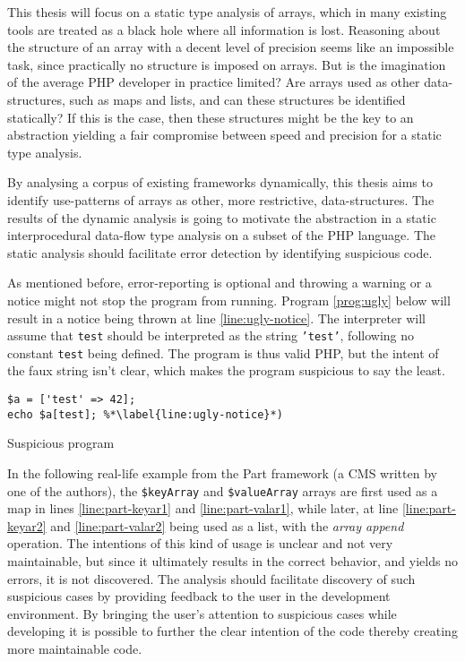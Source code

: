 This thesis will focus on a static type analysis of arrays, which in many existing tools are treated as a black hole where all information is lost.  Reasoning about the structure of an array with a decent level of precision seems like an impossible task, since practically no structure is imposed on arrays. But is the imagination of the average PHP developer in practice limited? Are arrays used as other data-structures, such as maps and lists, and can these structures be identified statically? If this is the case, then these structures might be the key to an abstraction yielding a fair compromise between speed and precision for a static type analysis. 

By analysing a corpus of existing frameworks dynamically, this thesis aims to identify use-patterns of arrays as other, more restrictive, data-structures. The results of the dynamic analysis is going to motivate the abstraction in a static interprocedural data-flow type analysis on a subset of the PHP language. The static analysis should facilitate error detection by identifying suspicious code. 

As mentioned before, error-reporting is optional and throwing a warning or a notice might not stop the program from running. Program \ref{prog:ugly} below will result in a notice being thrown at line \ref{line:ugly-notice}. The interpreter will assume that \texttt{test} should be interpreted as the string \texttt{'test'}, following no constant \texttt{test} being defined. The program is thus valid PHP, but the intent of the faux string isn't clear, which makes the program suspicious to say the least.  

\begin{program}
\centering 
\begin{lstlisting}
$a = ['test' => 42];
echo $a[test]; %*\label{line:ugly-notice}*)
\end{lstlisting}
\caption{Suspicious program \label{prog:ugly}}
\end{program}

In the following real-life example from the Part framework (a CMS written by one of the authors), the \texttt{\$keyArray} and \texttt{\$valueArray} arrays are first used as a map in lines \ref{line:part-keyar1} and \ref{line:part-valar1}, while later, at line \ref{line:part-keyar2} and \ref{line:part-valar2} being used as a list, with the \emph{array append} operation. The intentions of this kind of usage is unclear and not very maintainable, but since it ultimately results in the correct behavior, and yields no errors, it is not discovered. The analysis should facilitate discovery of such suspicious cases by providing feedback to the user in the development environment. By bringing the user's attention to suspicious cases while developing it is possible to further the clear intention of the code thereby creating more maintainable code.

